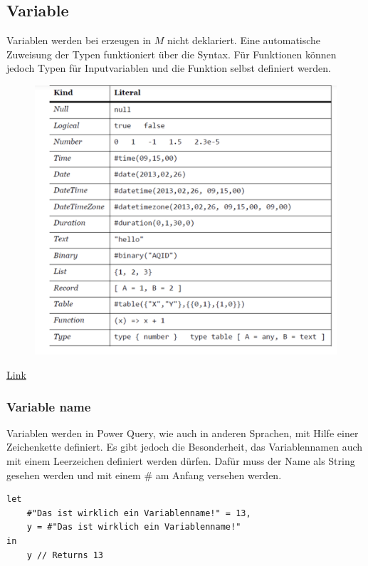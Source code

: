 \subsection{Variable}
Variablen werden bei erzeugen in $M$ nicht deklariert. Eine automatische Zuweisung der Typen funktioniert über die Syntax. Für Funktionen können jedoch Typen für Inputvariablen und die Funktion selbst definiert werden.
\begin{figure}[H]
	\centering
	\includegraphics[scale = 0.3]{attachment/chapter_1/screenshot030}
	\caption{}
	\label{fig:screenshot030}
\end{figure}
\href{https://radacad.com/basics-of-m-power-query-formula-language}{Link}

\subsubsection{Variable name}
Variablen werden in Power Query, wie auch in anderen Sprachen, mit Hilfe einer Zeichenkette definiert. Es gibt jedoch die Besonderheit, das Variablennamen auch mit einem Leerzeichen definiert werden dürfen. Dafür muss der Name als String gesehen werden und mit einem $\#$ am Anfang versehen werden.
\begin{lstlisting}[style=M]
let
	#"Das ist wirklich ein Variablenname!" = 13,
	y = #"Das ist wirklich ein Variablenname!"
in
	y // Returns 13
\end{lstlisting} 

